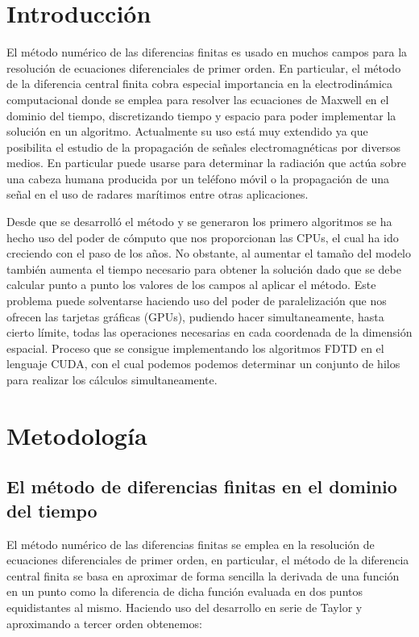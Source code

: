 \documentclass[11pt,a4paper,twoside,pdf]{article}
\numberwithin{equation}{section}
\begin{document}
\tableofcontents

\newpage

\pagestyle{fancy}
\fancyhead[RO,LE]{\leftmark}
\fancyhead[LO,RE]{\thepage}
\fancyfoot{}

\section{Introducción}
El método numérico de las diferencias finitas es usado en muchos campos para la resolución de ecuaciones diferenciales de primer orden. En particular, el método de la diferencia central finita cobra especial importancia en la electrodinámica computacional donde se emplea para resolver las ecuaciones de Maxwell en el dominio del tiempo, discretizando tiempo y espacio para poder implementar la solución en un algoritmo.
Actualmente su uso está muy extendido ya que posibilita el estudio de la propagación de señales electromagnéticas por diversos medios. En particular puede usarse para determinar la radiación que actúa sobre una cabeza humana producida por un teléfono móvil o la propagación de una señal en el uso de radares marítimos entre otras aplicaciones.

Desde que se desarrolló el método y se generaron los primero algoritmos se ha hecho uso del poder de cómputo que nos proporcionan las CPUs, el cual ha ido creciendo con el paso de los años. No obstante, al aumentar el tamaño del modelo también aumenta el tiempo necesario para obtener la solución dado que se debe calcular punto a punto los valores de los campos al aplicar el método. Este problema puede solventarse haciendo uso del poder de paralelización que nos ofrecen las tarjetas gráficas (GPUs), pudiendo hacer simultaneamente, hasta cierto límite, todas las operaciones necesarias en cada coordenada de la dimensión espacial. Proceso que se consigue implementando los algoritmos FDTD en el lenguaje CUDA, con el cual podemos podemos determinar un conjunto de hilos para realizar los cálculos simultaneamente.








\section{Metodología}
\subsection{El método de diferencias finitas en el dominio del tiempo} \label{section:metodo_diferencias_finitas}
El método numérico de las diferencias finitas se emplea en la resolución de ecuaciones diferenciales de primer orden, en particular, el método de la diferencia central finita se basa en aproximar de forma sencilla la derivada de una función en un punto como la diferencia de dicha función evaluada en dos puntos equidistantes al mismo. Haciendo uso del desarrollo en serie de Taylor y aproximando a tercer orden obtenemos:
\end{document}
